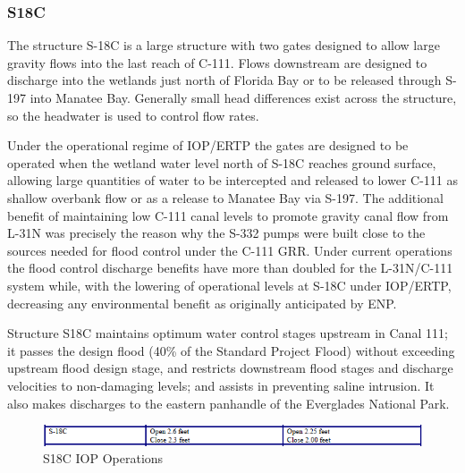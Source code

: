 
\clearpage
\subsubsection{S18C}

The structure S-18C is a large structure with two gates designed to allow large gravity flows into the last reach of C-111.
Flows downstream are designed to discharge into the wetlands just north of Florida Bay or to be released through S-197 into Manatee Bay.
Generally small head differences exist across the structure, so the headwater is used to control flow rates.

Under the operational regime of IOP/ERTP the gates are designed to be operated when the wetland water level north of S-18C reaches ground surface, allowing large quantities of water to be intercepted and released to lower C-111 as shallow overbank flow or as a release to Manatee Bay via S-197.
The additional benefit of maintaining low C-111 canal levels to promote gravity canal flow from L-31N was precisely the reason why the S-332 pumps were built close to the sources needed for flood control under the C-111 GRR.
Under current operations the flood control discharge benefits have more than doubled for the L-31N/C-111 system while, with the lowering of operational levels at S-18C under IOP/ERTP, decreasing any environmental benefit as originally anticipated by ENP.

Structure S18C maintains optimum water control stages upstream in Canal 111; it passes the design flood (40\% of the Standard Project Flood) without exceeding upstream flood design stage, and restricts downstream flood stages and discharge velocities to non-damaging levels; and assists in preventing saline intrusion. It also makes discharges to the eastern panhandle of the Everglades National Park.


\begin{figure}[!h]
  \begin{center}
  \includegraphics[width=6.5in]{../figs/S18C_IOPops.png}
  \caption{S18C IOP Operations}
  \label{fig:S18Ciop}
  \end{center}
\end{figure}


